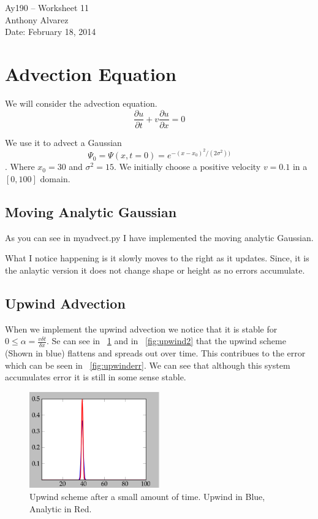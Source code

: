 \documentclass[11pt,letterpaper]{article}
\begin{document}
\begin{center}
\Large
Ay190 -- Worksheet 11\\
Anthony Alvarez\\
Date: February 18, 2014
\end{center}

\section{Advection Equation}

We will consider the advection equation.
$$ \frac{\partial u}{\partial t} + v \frac{\partial u}{\partial x} = 0$$

We use it to advect a Gaussian $$ \Psi_0 = \Psi(x,t=0) = e^{-(x-x_0)^2/(2\sigma^2))}$$.
Where $x_0 = 30$ and $\sigma^2 = 15$. We initially choose a positive velocity
$v=0.1$ in a $[0,100]$ domain. 

\subsection{Moving Analytic Gaussian}

As you can see in myadvect.py I have implemented the moving analytic Gaussian.

What I notice happening is it slowly moves to the right as it updates. Since, 
it is the anlaytic version it does not change shape or height as no errors
accumulate. 

\subsection{Upwind Advection}

When we implement the upwind advection we notice that it is stable for 
$0\leq \alpha = \frac{v\delta t}{\delta x}$. Se can see in ~\ref{fig:upwind1}
and in ~\ref{fig:upwind2} that the upwind scheme (Shown in blue) flattens and
spreads out over time. This contribues to the error which can be seen in
~\ref{fig:upwinderr}. We can see that although this system accumulates error it 
is still in some sense stable. 

\begin{figure}[bth]
\centering
\includegraphics[width=0.5\textwidth]{Upwind1.png}
\caption{Upwind scheme after a small amount of time. Upwind in Blue, Analytic in Red.}
\label{fig:upwind1}
\end{figure}
\end{document}

